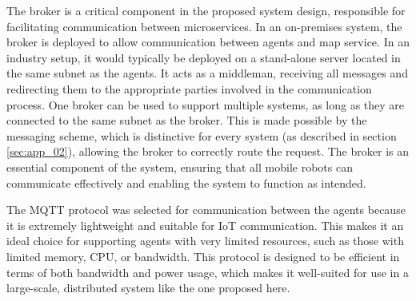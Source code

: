 The broker is a critical component in the proposed system design, responsible for facilitating communication between microservices. In an on-premises system, the broker is deployed to allow communication between agents and map service. In an industry setup, it would typically be deployed on a stand-alone server located in the same subnet as the agents. It acts as a middleman, receiving all messages and redirecting them to the appropriate parties involved in the communication process. One broker can be used to support multiple systems, as long as they are connected to the same subnet as the broker. This is made possible by the messaging scheme, which is distinctive for every system (as described in section \ref{sec:app_02}), allowing the broker to correctly route the request. The broker is an essential component of the system, ensuring that all mobile robots can communicate effectively and enabling the system to function as intended.

The MQTT protocol was selected for communication between the agents because it is extremely lightweight and suitable for IoT communication. This makes it an ideal choice for supporting agents with very limited resources, such as those with limited memory, CPU, or bandwidth. This protocol is designed to be efficient in terms of both bandwidth and power usage, which makes it well-suited for use in a large-scale, distributed system like the one proposed here.